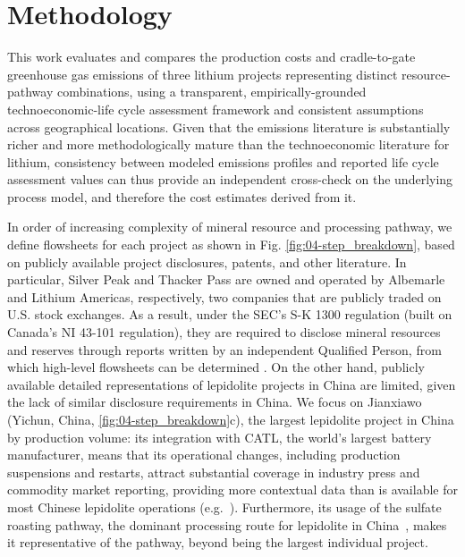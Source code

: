 \documentclass{article}
\renewcommand\_{\textunderscore\allowbreak}
\begin{document}
\section{Methodology}\label{sec:04-scopemethod}

This work evaluates and compares the production costs and cradle-to-gate greenhouse gas emissions of three lithium projects representing distinct resource-pathway combinations, using a transparent, empirically-grounded technoeconomic-life cycle assessment framework and consistent assumptions across geographical locations. Given that the emissions literature is substantially richer and more methodologically mature than the technoeconomic literature for lithium, consistency between modeled emissions profiles and reported life cycle assessment values can thus provide an independent cross-check on the underlying process model, and therefore the cost estimates derived from it. 

In order of increasing complexity of mineral resource and processing pathway, we define flowsheets for each project as shown in Fig. \ref{fig:04-step_breakdown}, based on publicly available project disclosures, patents, and other literature. In particular, Silver Peak and Thacker Pass are owned and operated by Albemarle and Lithium Americas, respectively, two companies that are publicly traded on U.S. stock exchanges. As a result, under the SEC's S-K 1300 \cite{SECgovModernizationProperty} regulation (built on Canada's NI 43-101 regulation), they are required to disclose mineral resources and reserves through reports written by an independent Qualified Person, from which high-level flowsheets can be determined \cite{srkconsultingSECTechnicalReport2023a, sgscanadaincSK1300Technical2024}. On the other hand, publicly available detailed representations of lepidolite projects in China are limited, given the lack of similar disclosure requirements in China. We focus on Jianxiawo (Yichun, China, \ref{fig:04-step_breakdown}c), the largest lepidolite project in China by production volume: its integration with CATL, the world's largest battery manufacturer, means that its operational changes, including production suspensions and restarts, attract substantial coverage in industry press and commodity market reporting, providing more contextual data than is available for most Chinese lepidolite operations (e.g.~\cite{liChinasCATLSuspends2025,jamasmieCATLCutLithium2024,benchmarkteamRestartCATLsJianxiawo2026,benchmarkteamCATLSuspendsOperations}). Furthermore, its usage of the sulfate roasting pathway, the dominant processing route for lepidolite in China~\cite{dengSystematicReviewSulfate2026}, makes it representative of the pathway, beyond being the largest individual project.
\end{document}
